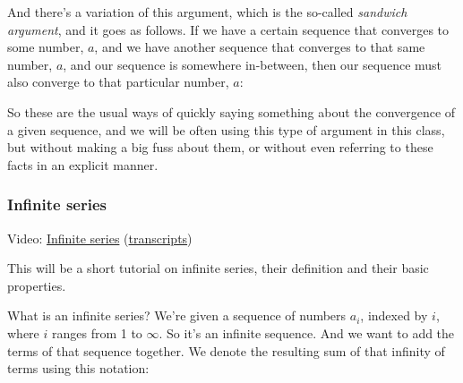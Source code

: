 \documentclass[pdftex, brazil, 12pt, twoside]{article}
\begin{document}
And there's a variation of this argument, which is the
so-called \emph{sandwich argument}, and it goes as follows.
If we have a certain sequence that converges to some number,
$a$, and we have another sequence that converges to
that same number, $a$, and our sequence is somewhere
in-between, then our sequence must also converge to that
particular number, $a$:

\begin{figure}[H]
  \begin{center}
  \end{center}
\end{figure}

So these are the usual ways of quickly saying something about
the convergence of a given sequence, and we will be often
using this type of argument in this class, but without making
a big fuss about them, or without even referring to
these facts in an explicit manner.

\subsubsection{Infinite series}
\label{un1-math-infinite-series}

Video: \href{https://www.youtube.com/watch?v=zJljSLqUbUc}{Infinite series}
(\href{Unit-1/02\_mathematical\_background/mb\_6\_transcripts.pdf}{transcripts})

This will be a short tutorial on infinite series, their
definition and their basic properties.

What is an infinite series?
We're given a sequence of numbers $a_i$, indexed by $i$,
where $i$ ranges from 1 to $\infty$.
So it's an infinite sequence.
And we want to add the terms of that sequence together.
We denote the resulting sum of that infinity of terms using
this notation:

\begin{figure}[H]
  \begin{center}
  \end{center}
\end{figure}
\end{document}
